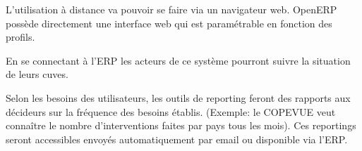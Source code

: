 L'utilisation à distance va pouvoir se faire via un navigateur web. OpenERP possède directement une interface web qui est paramétrable en fonction des profils.

En se connectant à l'ERP les acteurs de ce système pourront suivre la situation de leurs cuves.

Selon les besoins des utilisateurs, les outils de reporting feront des rapports aux décideurs sur la fréquence des besoins établis. (Exemple: le COPEVUE veut connaître le nombre d'interventions faites par pays tous les mois). Ces reportings seront accessibles envoyés automatiquement par email ou disponible via l'ERP. 
